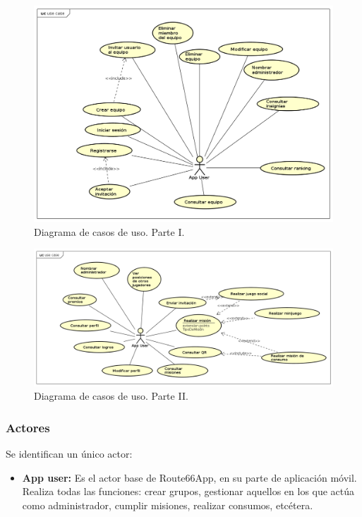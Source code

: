 \documentclass[twoside]{report}
\begin{document}
\begin{figure}[H]
\begin{center}
\includegraphics[scale=0.47]{images/usecase0.png}
\caption{Diagrama de casos de uso. Parte I.}
\end{center}
\end{figure}

\begin{figure}[H]
\begin{center}
\includegraphics[scale=0.47]{images/usecase1.png}
\caption{Diagrama de casos de uso. Parte II.}
\end{center}
\end{figure}

\subsubsection{Actores}

Se identifican un único actor:

\begin{itemize}
\item \textbf{App user:} Es el actor base de Route66App, en su parte de aplicación móvil. Realiza todas las funciones: crear grupos, gestionar aquellos en los que actúa como administrador, cumplir misiones, realizar consumos, etcétera.
\end{itemize}
\end{document}
